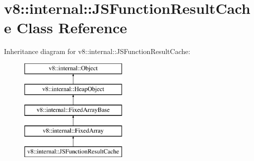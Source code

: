 \hypertarget{classv8_1_1internal_1_1_j_s_function_result_cache}{}\section{v8\+:\+:internal\+:\+:J\+S\+Function\+Result\+Cache Class Reference}
\label{classv8_1_1internal_1_1_j_s_function_result_cache}
Inheritance diagram for v8\+:\+:internal\+:\+:J\+S\+Function\+Result\+Cache\+:\begin{figure}[H]
\begin{center}
\leavevmode
\includegraphics[height=5.000000cm]{classv8_1_1internal_1_1_j_s_function_result_cache}
\end{center}
\end{figure}
